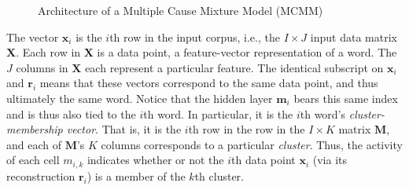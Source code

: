 \begin{figure}[htb]
\begin{center}
\end{center}
\caption{Architecture of a Multiple Cause Mixture Model (MCMM)} 
\label{fig:mcmm}
\end{figure}

The vector $\mathbf{x}_i$ is the $i$th row in the 
input corpus, i.e., the $I \times J$ input data matrix $\textbf{X}$. Each 
row in $\textbf{X}$ is a data point, a feature-vector representation of a word. 
The $J$ columns in  $\textbf{X}$ each represent a particular feature.
The identical subscript on $\mathbf{x}_i$ 
and $\mathbf{r}_i$ means that these vectors correspond to the same data 
point, and thus ultimately the same word. Notice that the hidden 
layer $\textbf{m}_i$ bears this same index and is thus also tied to the $i$th word. In particular, it 
is the $i$th word's 
\emph{cluster-membership vector}. That is, it is the $i$th row in the row 
in the $I \times K$ matrix 
$\mathbf{M}$, and each of $\mathbf{M}$'s $K$ columns corresponds to a particular 
\emph{cluster}. Thus, the activity of each cell $m_{i,k}$ indicates whether or not the $i$th 
data point $\mathbf{x}_i$ (via its reconstruction $\mathbf{r}_i$) is a member of the 
$k$th cluster.

